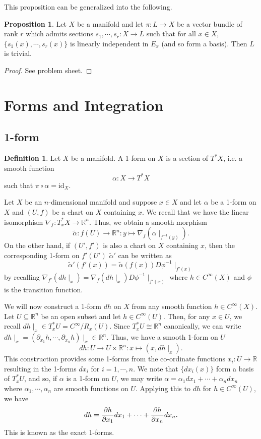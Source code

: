 \documentclass[]{article}
\theoremstyle{definition}
\theoremstyle{definition}
\newtheorem{definition}{Definition}[section]
\newtheorem{proposition}{Proposition}[section]
\begin{document}
This proposition can be generalized into the following.

\begin{proposition}
  Let \(X\) be a manifold and let \(\pi : L \to X\) be a vector bundle of rank 
  \(r\) which admits sections \(s_1, \cdots, s_r : X \to L\) such that 
  for all \(x \in X\), \(\{s_1(x), \cdots, s_r(x)\}\) is linearly independent 
  in \(E_x\) (and so form a basis). Then \(L\) is trivial.
\end{proposition}
\begin{proof}
  See problem sheet.
\end{proof}

\newpage
\section{Forms and Integration}

\subsection{1-form}

\begin{definition}
  Let \(X\) be a manifold. A 1-form on \(X\) is a section of \(T^*X\), i.e. 
  a smooth function 
  \[\alpha : X \to T^* X\]
  such that \(\pi \circ \alpha = \text{id}_X\).
\end{definition}

Let \(X\) be an \(n\)-dimensional manifold and suppose \(x \in X\) and let 
\(\alpha\) be a 1-form on \(X\) and \((U, f)\) be a chart on \(X\) containing 
\(x\). We recall that we have the linear isomorphism 
\(\nabla_f : T^*_x X \to \mathbb{R}^n\). Thus, we obtain a smooth morphism 
\[\tilde \alpha : f(U) \to \mathbb{R}^n : y \mapsto \nabla_f(\alpha\mid_{f^{-1}(y)}).\]
On the other hand, if \((U', f')\) is also a chart on \(X\) containing 
\(x\), then the corresponding 1-form on \(f'(U')\) \(\tilde \alpha'\) can be 
written as 
\[\tilde \alpha'(f'(x)) = \tilde \alpha(f(x)) D\phi^{-1}\mid_{f'(x)}\]
by recalling \(\nabla_{f'}(dh\mid_x) = \nabla_f(dh\mid_x) D\phi^{-1}\mid_{f'(x)}\)
where \(h \in C^\infty(X)\) and \(\phi\) is the transition function. 

We will now construct a 1-form \(dh\) on \(X\) from any smooth function 
\(h \in C^\infty(X)\). Let \(U \subseteq \mathbb{R}^n\) be an open subset and 
let \(h \in C^\infty(U)\). Then, for any \(x \in U\), we recall 
\(dh\mid_x \in T^*_x U = C^\infty / R_x(U)\). Since \(T^*_x U \cong \mathbb{R}^n\) 
canonically, we can write \(dh\mid_x = 
(\partial_{x_1} h, \cdots, \partial_{x_n} h)\mid_x \in \mathbb{R}^n\).
Thus, we have a smooth 1-form on \(U\) 
\[dh : U \to U \times \mathbb{R}^n : x \mapsto (x, dh\mid_x).\]
This construction provides some 1-forms from the co-ordinate functions 
\(x_i : U \to \mathbb{R}\) resulting in the 1-forms \(dx_i\) for 
\(i = 1, \cdots, n\). We note that \(\{dx_i(x)\}\) form a basis of 
\(T^*_x U\), and so, if \(\alpha\) is a 1-form on \(U\), we may write 
\(\alpha = \alpha_1 dx_1 + \cdots + \alpha_n dx_n\) where 
\(\alpha_1, \cdots, \alpha_n\) are smooth functions on \(U\).
Applying this to \(dh\) for \(h \in C^\infty(U)\), we have 
\[dh = \pdv{h}{x_1} dx_1 + \cdots + \pdv{h}{x_n} dx_n.\]
This is known as the exact 1-forms.
\end{document}
